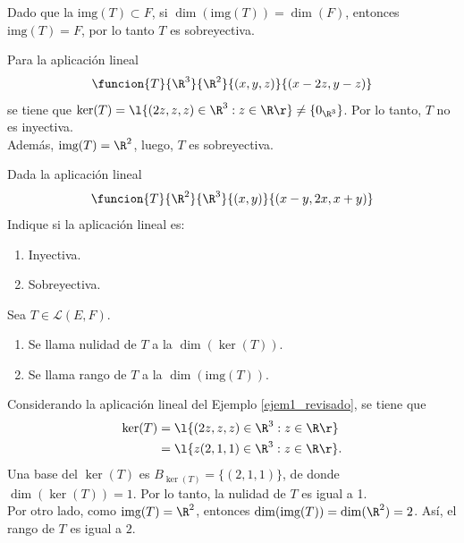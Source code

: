 \documentclass[compacto,10pt]{pubciencias-notas}
\begin{document}
\begin{obs}
Dado que la $\text{img}(T)\subset F$, si $\dim(\text{img}(T))=\dim(F)$, entonces $\text{img}(T)=F$, por lo tanto $T$ es sobreyectiva.
\end{obs}

\begin{ejem}\label{ejem1_revisado}
Para la aplicación lineal 
\[
 \funcion{T}{\R^3}{\R^2}{(x,y,z)}{(x-2z,y-z)}
\]
se tiene que $\ker(T)=\l\{(2z,z,z)\in \R^3:z\in\R\r\}\neq\{0_{\R^3}\}$. Por lo tanto, $T$ no es inyectiva.\\
Además, $\text{img}(T) =\R^2$, luego, $T$ es sobreyectiva.
\end{ejem}

\begin{ejer}\label{ejer1}
Dada la aplicación lineal 
\[
 \funcion{T}{\R^2}{\R^3}{(x,y)}{(x-y,2x,x+y)}
\]
Indique si la aplicación lineal es:
\begin{enumerate}
\item[$a)$] Inyectiva.
\item[$b)$] Sobreyectiva.
\end{enumerate}
\end{ejer}

\begin{defi}
    Sea $T \in \mathscr{L}(E,F)$.
    \begin{enumerate}
    \item 
        Se llama nulidad de $T$ a la $\dim(\ker(T))$.
    \item 
        Se llama rango de $T$ a la $\dim(\text{img}(T))$.
    \end{enumerate}
\end{defi}

\begin{ejem}\hspace{0pt}\label{NulidadRango}\label{ejem2}
Considerando la aplicación lineal del Ejemplo \ref{ejem1_revisado}, se tiene que 
\begin{align*}
 \ker(T) &= \l\{(2z,z,z)\in \R^3:z\in\R\r\} \\
         &= \l\{z(2,1,1)\in \R^3:z\in\R\r\}.
\end{align*}
Una base del $\ker(T)$ es $B_{\ker(T)}=\{(2,1,1)\}$, de donde $\dim(\ker(T))=1$. Por lo tanto, la nulidad de $T$ es igual a 1.\\
Por otro lado, como $\text{img}(T)=\R^2$, entonces $\dim(\text{img}(T))=\dim(\R^2)=2$. Así, el rango de $T$ es igual a $2$.
\end{ejem}
\end{document}
